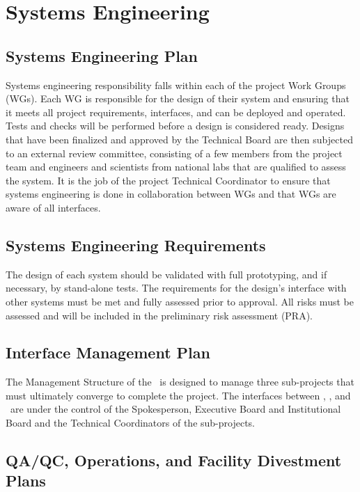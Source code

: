 \section{Systems Engineering}

\subsection{Systems Engineering Plan}
Systems engineering responsibility falls within each of the project Work Groups (WGs).  Each WG is responsible for the design of their system and ensuring that it meets all project requirements, interfaces, and can be deployed and operated.  Tests and checks will be performed before a design is considered ready.  Designs that have been finalized and approved by the Technical Board are then subjected to an external review committee, consisting of a few members from the project team and engineers and scientists from national labs that are qualified to assess the system.  It is the job of the project Technical Coordinator to ensure that systems engineering is done in collaboration between WGs and that WGs are aware of all interfaces.


\subsection{Systems Engineering Requirements}
The design of each system should be validated with full prototyping, and if necessary, by stand-alone tests. The requirements for the design's interface with other systems must be met and fully assessed prior to approval.  All risks must be assessed and will be included in the preliminary risk assessment (PRA).


\subsection{Interface Management Plan}
The Management Structure of the \GADMC\ is designed to manage three sub-projects that must ultimately converge to complete the project. The interfaces between \DSk, \Aria, and \Urania\ are under the control of the Spokesperson, Executive Board and Institutional Board and the Technical Coordinators of the sub-projects.


\subsection{QA/QC, Operations, and Facility Divestment Plans}

